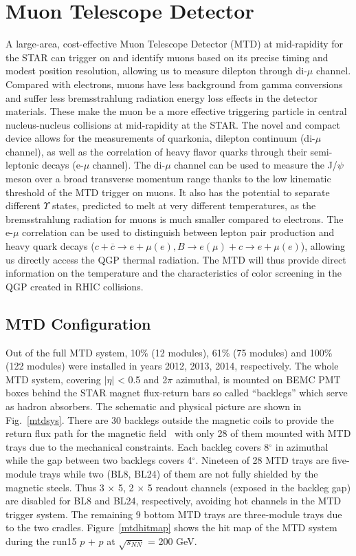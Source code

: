 \chapter{Muon Telescope Detector}

A large-area, cost-effective Muon Telescope Detector (MTD) at mid-rapidity for the STAR can trigger on and identify muons based on its precise timing and modest position resolution, allowing us to measure dilepton through di-$\mu$ channel. Compared with electrons, muons have less background from gamma conversions and suffer less bremsstrahlung radiation energy loss effects in the detector materials. These make the muon be a more effective triggering particle in central nucleus-nucleus collisions at mid-rapidity at the STAR. The novel and compact device allows for the measurements of quarkonia, dilepton continuum (di-$\mu$ channel), as well as the correlation of heavy ﬂavor quarks through their semi-leptonic decays (e-$\mu$ channel). The di-$\mu$ channel can be used to measure the J/$\psi$ meson over a broad transverse momentum range thanks to the low kinematic threshold of the MTD trigger on muons. It also has the potential to separate different $\varUpsilon$ states, predicted to melt at very different temperatures, as the bremsstrahlung radiation for muons is much smaller compared to electrons. The e-$\mu$ correlation can be used to distinguish between lepton pair production and heavy quark decays ($c + \overline{c} \rightarrow e + \mu(e), B \rightarrow e(\mu) + c \rightarrow e + \mu(e)$), allowing us directly access the QGP thermal radiation. The MTD will thus provide direct information on the temperature and the characteristics of color screening in the QGP created in RHIC collisions.

\section{MTD Configuration}

Out of the full MTD system, 10\%  (12 modules), 61\% (75 modules) and 100\% (122 modules) were installed in years 2012, 2013, 2014, respectively. The whole MTD system, covering $|\eta|$ < 0.5 and 2$\pi$ azimuthal, is mounted on BEMC PMT boxes behind the STAR magnet flux-return bars so called ``backlegs'' which serve as hadron absorbers. The schematic and physical picture are shown in Fig.~\ref{mtdsys}. There are 30 backlegs outside the magnetic coils to provide the return flux path for the magnetic field~\cite{STARmagnet} with only 28 of them mounted with MTD trays due to the mechanical constraints. Each backleg covers 8$^{\circ}$ in azimuthal while the gap between two backlegs covers 4$^{\circ}$. Nineteen of 28 MTD trays are five-module trays while two (BL8, BL24) of them are not fully shielded by the magnetic steels. Thus 3 $\times$ 5, 2 $\times$ 5 readout channels (exposed in the backleg gap) are disabled for BL8 and BL24, respectively, avoiding hot channels in the MTD trigger system. The remaining 9 bottom MTD trays are three-module trays due to the two cradles. Figure~\ref{mtdhitmap} shows the hit map of the MTD system during the run15 $p$ + $p$ at $\sqrt{s_{NN}}$ = 200 GeV.

